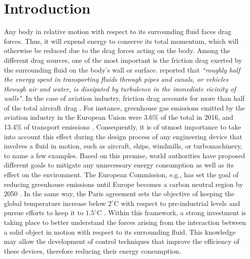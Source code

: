 \chapter{Introduction}\label{ch01}
Any body in relative motion with respect to its surrounding fluid faces drag forces.
Thus, it will expend energy to conserve its total momentum, which will otherwise be reduced due to the drag forces acting on the body.
Among the different drag sources, one of the most important is the friction drag exerted by the surrounding fluid on the body's wall or surface.
\citet{jimenez2012cascades} reported that \textit{``roughly half the energy spent in transporting fluids through pipes and canals, or vehicles through air and water, is dissipated by turbulence in the immediate vicinity of walls"}.
In the case of aviation industry, friction drag accounts for more than half of the total aircraft drag \citep{schrauf2005status}.
For instance, greenhouse gas emissions emitted by the aviation industry in the European Union were 3.6\% of the total in 2016, and 13.4\% of transport emissions \citep{european2019european}.
Consequently, it is of utmost importance to take into account this effect during the design process of any engineering device that involves a fluid in motion, such as aircraft, ships, windmills, or turbomachinery, to name a few examples.
Based on this premise, world authorities have proposed different goals to mitigate any unnecessary energy consumption as well as its effect on the environment.
The European Commission, e.g., has set the goal of reducing greenhouse emissions until Europe becomes a carbon neutral region by 2050 \citep{european2018clean}.
In the same way, the Paris agreement sets the objective of keeping the global temperature increase below $2^{\circ}$C with respect to pre-industrial levels and pursue efforts to keep it to $1.5^{\circ}$C \citep{unfccc2015adoption}.
Within this framework, a strong investment is taking place to better understand the forces arising from the interaction between a solid object in motion with respect to its surrounding fluid.
This knowledge may allow the development of control techniques that improve the efficiency of these devices, therefore reducing their energy consumption.

